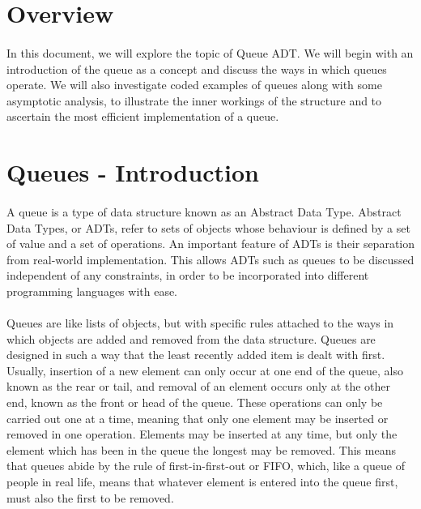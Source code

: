 \documentclass[12pt]{article}
\begin{document}
\MakeScribeTop

\section{Overview}

\paragraph{} In this document, we will explore the topic of Queue ADT. We will begin with an introduction of the queue as a concept and discuss the ways in which queues operate. We will also investigate coded examples of queues along with some asymptotic analysis, to illustrate the inner workings of the structure and to ascertain the most efficient implementation of a queue.

\section{Queues - Introduction}

\paragraph{} A queue is a type of data structure known as an Abstract Data Type. Abstract Data Types, or ADTs, refer to sets of objects whose behaviour is defined by a set of value and a set of operations. An important feature of ADTs is their separation from real-world implementation. This allows ADTs such as queues to be discussed independent of any constraints, in order to be incorporated into different programming languages with ease.
\paragraph{} Queues are like lists of objects, but with specific rules attached to the ways in which objects are added and removed from the data structure. Queues are designed in such a way that the least recently added item is dealt with first. Usually, insertion of a new element can only occur at one end of the queue, also known as the rear or tail, and removal of an element occurs only at the other end, known as the front or head of the queue. These operations can only be carried out one at a time, meaning that only one element may be inserted or removed in one operation. Elements may be inserted at any time, but only the element which has been in the queue the longest may be removed. This means that queues abide by the rule of first-in-first-out or FIFO, which, like a queue of people in real life, means that whatever element is entered into the queue first, must also the first to be removed.
\end{document}
